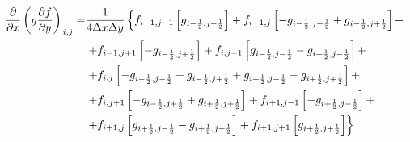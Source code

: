 \begin{equation*}
    \begin{split}
	    \left.
	        \frac
                {\partial }
                {\partial x}
	        \left(
	            g
	            \frac
	                {\partial f}
	                {\partial y}
	        \right)
        \right._{i, j}
	    = &
	    \frac
	        {1}
	        {4 \Delta x \Delta y}
	    \left\{
	        f_{i - 1, j - 1}
	        \left[
                g_{i - \onehalf, j - \onehalf}
            \right]
	        +
	        f_{i - 1, j}
	       \left[
	        	-
                g_{i - \onehalf, j - \onehalf}
	        	+
                g_{i - \onehalf, j + \onehalf}
	        \right]
	        +
        \right.
        \\ &
        \left.
            +
            \newline
	        f_{i - 1, j + 1}
	        \left[
                -
                g_{i - \onehalf, j + \onehalf}
            \right]
	        +
	        f_{i, j - 1}
	        \left[
                g_{i - \onehalf, j - \onehalf}
                -
                g_{i + \onehalf, j - \onehalf}
	    	\right]
            +
        \right.
        \\ &
        \left.
            +
            f_{i, j}
	        \left[
                -
                g_{i - \onehalf, j - \onehalf}
                +
                g_{i - \onehalf, j + \onehalf}
                +
                g_{i + \onehalf, j - \onehalf}
                -
                g_{i + \onehalf, j + \onehalf}
            \right]
            +
        \right.
        \\ &
        \left.
            +
            f_{i, j + 1}
            \left[
                -
                g_{i - \onehalf, j + \onehalf}
                +
                g_{i + \onehalf, j + \onehalf}
            \right]
            +
            f_{i + 1, j - 1}
            \left[
                -
                g_{i + \onehalf, j - \onehalf}
            \right]
            +
        \right.
        \\ &
        \left.
            +
            f_{i + 1, j}
            \left[
                g_{i + \onehalf, j - \onehalf}
                -
                g_{i + \onehalf, j + \onehalf}
            \right]
            +
            f_{i + 1, j + 1}
            \left[
                g_{i + \onehalf, j + \onehalf}
            \right]
        \right\}
    \end{split}
\end{equation*}

